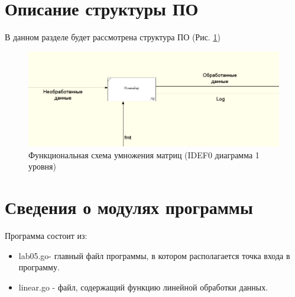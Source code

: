 \documentclass[12pt]{report}
\begin{document}
\section{Описание структуры ПО}
В данном разделе будет рассмотрена структура ПО (Рис. \ref{fig:mpr})
\begin{figure}[!htbp]
	\centering
	\includegraphics[width=1.25\linewidth]{lab05ram}
	\caption{Функциональная схема умножения матриц (IDEF0 диаграмма 1 уровня)}
	\label{fig:mpr}
\end{figure}

\section{Сведения о модулях программы}
Программа состоит из:
\begin{itemize}
	\item lab05.go- главный файл программы, в котором располагается точка входа в программу.
	\item linear.go - файл, содержащий функцию линейной обработки данных.
\end{itemize}
\end{document}
